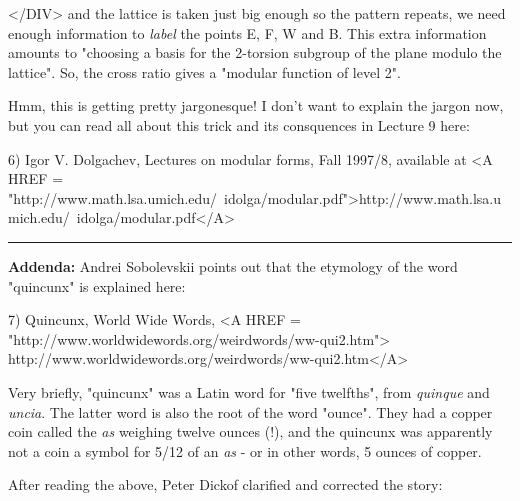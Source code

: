 </DIV>
and the lattice is taken just big enough so the pattern 
repeats, we need enough information to \emph{label}
the points E, F, W and B.  This extra information amounts to 
"choosing a basis for the 2-torsion subgroup of the plane modulo 
the lattice".  So, the cross ratio gives a "modular function
of level 2".  

Hmm, this is getting pretty jargonesque!  I don't want to explain the
jargon now, but you can read all about this trick and its consquences 
in Lecture 9 here:

6) Igor V. Dolgachev, Lectures on modular forms, Fall 1997/8,
available at <A HREF = "http://www.math.lsa.umich.edu/~idolga/modular.pdf">http://www.math.lsa.umich.edu/~idolga/modular.pdf</A>

\par\noindent\rule{\textwidth}{0.4pt}
\textbf{Addenda:}  Andrei Sobolevskii points out that the
etymology of the word "quincunx" is explained here:

7) Quincunx, World Wide Words,
<A HREF = "http://www.worldwidewords.org/weirdwords/ww-qui2.htm">
http://www.worldwidewords.org/weirdwords/ww-qui2.htm</A>

Very briefly, "quincunx" was a Latin word for
"five twelfths", from \emph{quinque} and \emph{uncia}.
The latter word is also the root of the word "ounce".
They had a copper coin called the \emph{as} weighing twelve
ounces (!), and the quincunx was apparently not a coin
a symbol for 5/12 of an \emph{as} - or in other words, 5 ounces
of copper.

After reading the above, Peter Dickof clarified and corrected 
the story: 

